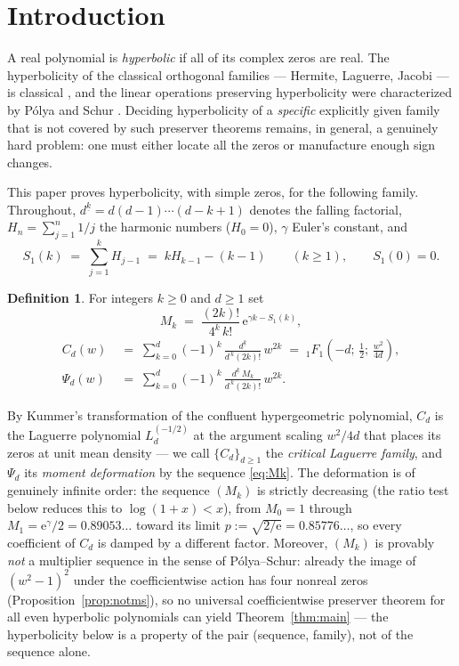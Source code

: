 \documentclass[11pt]{amsart}
\theoremstyle{definition}
\newtheorem{definition}[theorem]{Definition}
\theoremstyle{remark}
\newcommand{\e}{\mathrm{e}}
\newcommand{\hypF}[3]{{}_1F_1\!\left(#1;\,#2;\,#3\right)}
\begin{document}
\section{Introduction}\label{sec:intro}

A real polynomial is \emph{hyperbolic} if all of its complex zeros are
real. The hyperbolicity of the classical orthogonal families ---
Hermite, Laguerre, Jacobi --- is classical
\cite[Thm.~3.3.1]{szego}, and the linear operations preserving
hyperbolicity were characterized by P\'olya and Schur
\cite{polya-schur}. Deciding hyperbolicity of a \emph{specific}
explicitly given family that is not covered by such preserver theorems
remains, in general, a genuinely hard problem: one must either locate
all the zeros or manufacture enough sign changes.

This paper proves hyperbolicity, with simple zeros, for the following
family. Throughout, $d^{\underline{k}}=d(d-1)\cdots(d-k+1)$ denotes the
falling factorial, $H_n=\sum_{j=1}^n 1/j$ the harmonic numbers
($H_0=0$), $\gamma$ Euler's constant, and
\begin{equation}\label{eq:S1}
S_1(k)\;=\;\sum_{j=1}^{k}H_{j-1}\;=\;kH_{k-1}-(k-1)\qquad(k\ge 1),
\qquad S_1(0)=0 .
\end{equation}

\begin{definition}\label{def:family}
For integers $k\ge 0$ and $d\ge 1$ set
\begin{equation}\label{eq:Mk}
M_k\;=\;\frac{(2k)!}{4^k\,k!}\,\e^{\gamma k-S_1(k)},
\end{equation}
\begin{equation}\label{eq:CdPsid}
\begin{aligned}
C_d(w)\;&=\;\sum_{k=0}^{d}(-1)^k\,
\frac{d^{\underline{k}}}{d^{\,k}(2k)!}\,w^{2k}
\;=\;\hypF{-d}{\tfrac12}{\frac{w^2}{4d}},\\
\Psi_d(w)\;&=\;\sum_{k=0}^{d}(-1)^k\,
\frac{d^{\underline{k}}\,M_k}{d^{\,k}(2k)!}\,w^{2k}.
\end{aligned}
\end{equation}
\end{definition}

By Kummer's transformation of the confluent hypergeometric polynomial,
$C_d$ is the Laguerre polynomial $L_d^{(-1/2)}$ at the argument scaling
$w^2/4d$ that places its zeros at unit mean density --- we call
$\{C_d\}_{d \ge 1}$ the \emph{critical Laguerre family}, and
$\Psi_d$ its \emph{moment deformation} by the sequence
\eqref{eq:Mk}. The deformation is of genuinely infinite order: the
sequence $(M_k)$ is strictly decreasing
(the ratio test below reduces this to $\log(1+x)<x$), from $M_0=1$
through $M_1=\e^{\gamma}/2=0.89053\ldots$ toward its limit
$p:=\sqrt{2/\e}=0.85776\ldots$, so every coefficient of $C_d$ is
damped by a different factor. Moreover, $(M_k)$ is provably
\emph{not} a multiplier sequence in the sense of P\'olya--Schur:
already the image of $(w^2-1)^2$ under the coefficientwise action has
four nonreal zeros (Proposition~\ref{prop:notms}), so no
universal coefficientwise preserver theorem for all even hyperbolic
polynomials can yield
Theorem~\ref{thm:main} --- the hyperbolicity below is a property of
the pair (sequence, family), not of the sequence alone.
\end{document}
